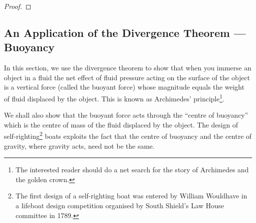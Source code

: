 \begin{proof}
\end{proof}




\subsection{An Application of the Divergence Theorem --- Buoyancy}
                                      \label{sec:buoy}

In this section, we use the divergence theorem to show that
when you immerse an object in a fluid the net effect of fluid pressure
acting on the surface of the object is a vertical force (called the buoyant
force) whose magnitude equals the weight of fluid displaced by the object. 
This is known as Archimedes' principle\footnote{The interested reader should
do a net search for the story of Archimedes and the golden crown.}. 

We shall also show that the buoyant
force acts through the ``centre of buoyancy'' which is the centre of mass of 
the fluid displaced by the object. The design of 
self-righting\footnote{The first design of a self-righting boat was
entered by William Wouldhave in a lifeboat design competition organised 
by South Shield's Law House committee in 1789.} boats exploits
the fact that the centre of buoyancy and the centre of gravity, where gravity 
acts, need not be the same.  


